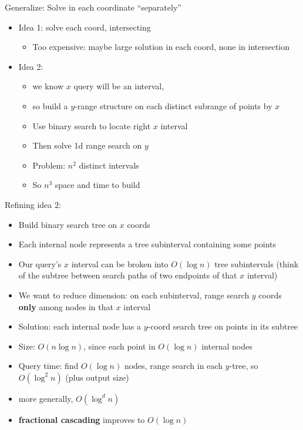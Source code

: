 \documentclass{article}
\begin{document}
Generalize: Solve in each coordinate ``separately'' %
\begin{itemize}
\item Idea 1: solve each coord, intersecting
\begin{itemize}
\item Too expensive: maybe large solution in each coord, none in
  intersection
\end{itemize}
\item Idea 2: 
\begin{itemize}
\item we know $x$ query will be an interval, 
\item so build a $y$-range structure on each distinct subrange of
  points by $x$
\item Use binary search to locate right $x$ interval
\item Then solve 1d range search on $y$
\item Problem: $n^2$ distinct intervals
\item So $n^3$ space and time to build
\end{itemize}
\end{itemize}

Refining idea 2:
\begin{itemize}
\item Build binary search tree on $x$ coords
\item Each internal node represents a tree subinterval containing some points
\item Our query's $x$ interval can be broken into $O(\log n)$ tree
  subintervals (think of the subtree between search paths of two endpoints of that $x$ interval) 
\item We want to reduce dimension: on each subinterval, range search
  $y$ coords \textbf{ only} among nodes in that $x$ interval
\item Solution: each internal node has a $y$-coord search tree on
  points in its subtree
\item Size: $O(n\log n)$, since each point in $O(\log n)$ internal
  nodes
\item Query time: find $O(\log n)$ nodes, range search in each
  $y$-tree, so $O(\log^2 n)$ (plus output size)
\item more generally, $O(\log^d n)$
\item \textbf{ fractional cascading} improves to $O(\log n)$
\end{itemize}
\end{document}
